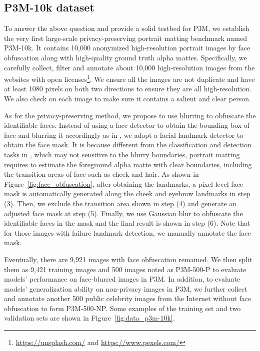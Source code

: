 \documentclass[twocolumn]{svjour3}
\begin{document}
\subsection{P3M-10k dataset}

To answer the above question and provide a solid testbed for P3M, we establish the very first large-scale privacy-preserving portrait matting benchmark named P3M-10k. It contains 10,000 anonymized high-resolution portrait images by face obfuscation along with high-quality ground truth alpha mattes. Specifically, we carefully collect, filter and annotate about 10,000 high-resolution images from the websites with open licenses\footnote{\url{https://unsplash.com/} and \url{https://www.pexels.com/}}. We ensure all the images are not duplicate and have at least 1080 pixels on both two directions to ensure they are all high-resolution. We also check on each image to make sure it contains a salient and clear person.

As for the privacy-preserving method, we propose to use blurring to obfuscate the identifiable faces. Instead of using a face detector to obtain the bounding box of face and blurring it accordingly as in \citep{yang2021study}, we adopt a facial landmark detector to obtain the face mask. It is because different from the classification and detection tasks in \citep{yang2021study}, which may not sensitive to the blurry boundaries, portrait matting requires to estimate the foreground alpha matte with clear boundaries, including the transition areas of face such as cheek and hair. As shown in Figure~\ref{fig:face_obfuscation}, after obtaining the landmarks, a pixel-level face mask is automatically generated along the cheek and eyebrow landmarks in step (3). Then, we exclude the transition area shown in step (4) and generate an adjusted face mask at step (5). Finally, we use Gaussian blur to obfuscate the identifiable faces in the mask and the final result is shown in step (6). Note that for those images with failure landmark detection, we manually annotate the face mask.

Eventually, there are 9,921 images with face obfuscation remained. We then split them as 9,421 training images and 500 images noted as P3M-500-P to evaluate models' performance on face-blurred images in P3M. In addition, to evaluate models' generalization ability on non-privacy images in P3M, we further collect and annotate another 500 public celebrity images from the Internet without face obfuscation to form P3M-500-NP. Some examples of the training set and two validation sets are shown in Figure~\ref{fig:data_p3m-10k}.
\end{document}
